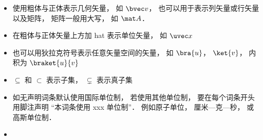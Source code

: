 
\begin{itemize}
\item 使用粗体与正体表示几何矢量， 如 $\bvec v$， 也可以用于表示列矢量或行矢量以及矩阵， 矩阵一般用大写， 如 $\mat A$．
\item 在粗体与正体矢量上方加 hat 表示单位矢量， 如 $\uvec x$
\item 也可以用狄拉克符号表示任意矢量空间的矢量， 如 $\bra{u}$， $\ket{v}$， 内积为 $\braket{u}{v}$
\item $\subseteq$ 和 $\subset$ 表示子集， $\subsetneq$ 表示真子集
\item 如无声明词条默认使用国际单位制， 若使用其他单位制， 要在每个词条开头用脚注声明 “本词条使用 xxx 单位制”． 例如原子单位， 厘米—克—秒， 或高斯单位制．
\item 
\end{itemize}
